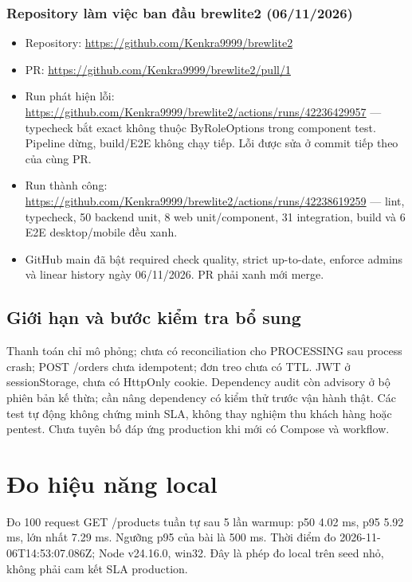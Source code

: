 \documentclass[a4paper,12pt,oneside]{report}
\begin{document}
\subsubsection{Repository làm việc ban đầu brewlite2 (06/\allowbreak{}11/\allowbreak{}2026)}
\begin{itemize}
\item Repository: \url{https://github.com/Kenkra9999/brewlite2}
\item PR: \url{https://github.com/Kenkra9999/brewlite2/pull/1}
\item Run phát hiện lỗi: \url{https://github.com/Kenkra9999/brewlite2/actions/runs/42236429957} — typecheck bắt {\small\ttfamily exact} không thuộc ByRoleOptions trong component test. Pipeline dừng, build/\allowbreak{}E2E không chạy tiếp. Lỗi được sửa ở commit tiếp theo của cùng PR.
\item Run thành công: \url{https://github.com/Kenkra9999/brewlite2/actions/runs/42238619259} — lint, typecheck, 50 backend unit, 8 web unit/\allowbreak{}component, 31 integration, build và 6 E2E desktop/\allowbreak{}mobile đều xanh.
\item GitHub main đã bật required check {\small\ttfamily quality}, strict up-to-date, enforce admins và linear history ngày 06/\allowbreak{}11/\allowbreak{}2026. PR phải xanh mới merge.
\end{itemize}

\subsection{Giới hạn và bước kiểm tra bổ sung}
Thanh toán chỉ mô phỏng; chưa có reconciliation cho PROCESSING sau process crash; POST /\allowbreak{}orders chưa idempotent; đơn treo chưa có TTL. JWT ở sessionStorage, chưa có HttpOnly cookie. Dependency audit còn advisory ở bộ phiên bản kế thừa; cần nâng dependency có kiểm thử trước vận hành thật. Các test tự động không chứng minh SLA, không thay nghiệm thu khách hàng hoặc pentest. Chưa tuyên bố đáp ứng production khi mới có Compose và workflow.


\section{Đo hiệu năng local}Đo 100 request GET /products tuần tự sau 5 lần warmup: p50 4.02 ms, p95 5.92 ms, lớn nhất 7.29 ms. Ngưỡng p95 của bài là 500 ms. Thời điểm đo 2026-11-06T14:53:07.086Z; Node v24.16.0, win32. Đây là phép đo local trên seed nhỏ, không phải cam kết SLA production.
\end{document}
